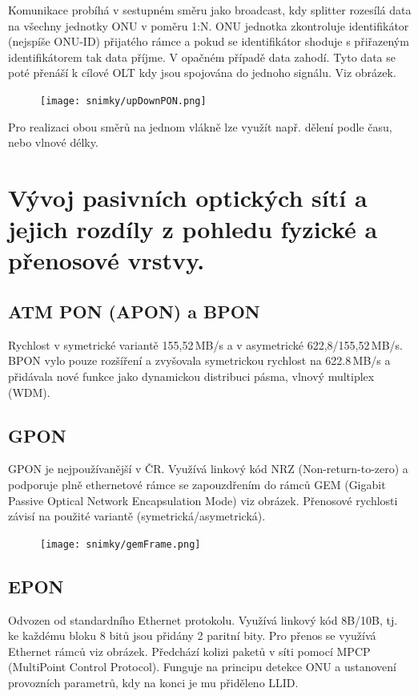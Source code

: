 Komunikace probíhá v sestupném směru jako broadcast, kdy splitter rozesílá data na všechny jednotky ONU v poměru 1:N. ONU jednotka zkontroluje identifikátor (nejspíše ONU-ID) přijatého rámce a pokud se identifikátor shoduje s přiřazeným identifikátorem tak data příjme. V opačném případě data zahodí. Tyto data se poté přenáší k cílové OLT kdy jsou spojována do jednoho signálu. Viz obrázek.

\begin{figure} [h]
    \centering
    \texttt{[image: snimky/upDownPON.png]}
\end{figure}

Pro realizaci obou směrů na jednom vlákně lze využít např. dělení podle času, nebo vlnové délky.
\clearpage
\section{Vývoj pasivních optických sítí a jejich rozdíly z pohledu fyzické a přenosové vrstvy.}

\subsection{ATM PON (APON) a BPON}
Rychlost v symetrické variantě 155,52\,MB/s a v asymetrické 622,8/155,52\,MB/s. BPON vylo pouze rozšíření a zvyšovala symetrickou rychlost na 622.8\,MB/s a přidávala nové funkce jako dynamickou distribuci pásma, vlnový multiplex (WDM).

\subsection{GPON}
GPON je nejpoužívanější v ČR. Využívá linkový kód NRZ (Non-return-to-zero) a podporuje plně ethernetové rámce se zapouzdřením do rámců GEM (Gigabit Passive Optical Network Encapsulation Mode) viz obrázek. Přenosové rychlosti závisí na použité variantě (symetrická/asymetrická).

\begin{figure} [h]
    \centering
    \texttt{[image: snimky/gemFrame.png]}
\end{figure}

\subsection{EPON}
Odvozen od standardního Ethernet protokolu. Využívá linkový kód 8B/10B, tj. ke každému bloku 8 bitů jsou přidány 2 paritní bity. Pro přenos se využívá Ethernet rámců viz obrázek. Předchází kolizi paketů v síti pomocí MPCP (MultiPoint Control Protocol). Funguje na principu detekce ONU a ustanovení provozních parametrů, kdy na konci je mu přiděleno LLID.

